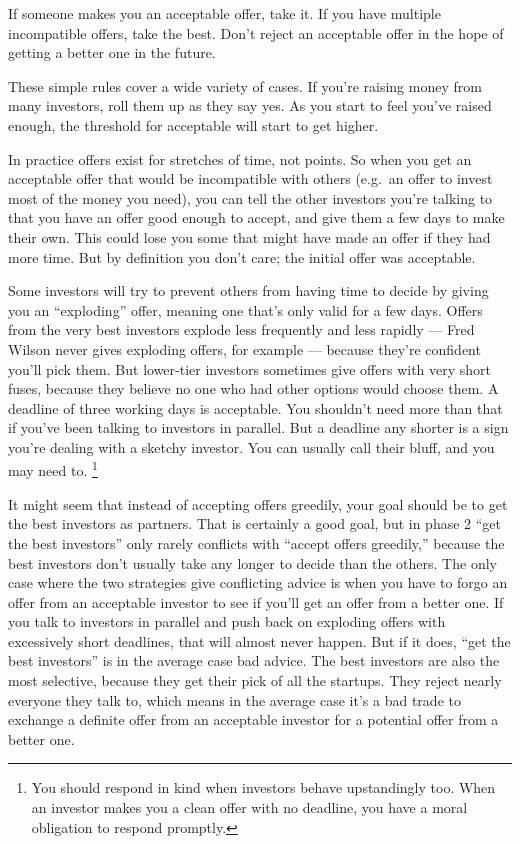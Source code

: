 \documentclass[12pt]{book}
\begin{document}
If someone makes you an acceptable offer, take it. If you have multiple
incompatible offers, take the best. Don't reject an acceptable offer in
the hope of getting a better one in the future.

These simple rules cover a wide variety of cases. If you're raising
money from many investors, roll them up as they say yes. As you start to
feel you've raised enough, the threshold for acceptable will start to
get higher.

In practice offers exist for stretches of time, not points. So when you
get an acceptable offer that would be incompatible with others (e.g.~an
offer to invest most of the money you need), you can tell the other
investors you're talking to that you have an offer good enough to
accept, and give them a few days to make their own. This could lose you
some that might have made an offer if they had more time. But by
definition you don't care; the initial offer was acceptable.

Some investors will try to prevent others from having time to decide by
giving you an ``exploding'' offer, meaning one that's only valid for a
few days. Offers from the very best investors explode less frequently
and less rapidly --- Fred Wilson never gives exploding offers, for
example --- because they're confident you'll pick them. But lower-tier
investors sometimes give offers with very short fuses, because they
believe no one who had other options would choose them. A deadline of
three working days is acceptable. You shouldn't need more than that if
you've been talking to investors in parallel. But a deadline any shorter
is a sign you're dealing with a sketchy investor. You can usually call
their bluff, and you may need to. \footnote{You should respond in kind when investors behave upstandingly
too. When an investor makes you a clean offer with no deadline, you have
a moral obligation to respond promptly.}

It might seem that instead of accepting offers greedily, your goal
should be to get the best investors as partners. That is certainly a
good goal, but in phase 2 ``get the best investors'' only rarely
conflicts with ``accept offers greedily,'' because the best investors
don't usually take any longer to decide than the others. The only case
where the two strategies give conflicting advice is when you have to
forgo an offer from an acceptable investor to see if you'll get an offer
from a better one. If you talk to investors in parallel and push back on
exploding offers with excessively short deadlines, that will almost
never happen. But if it does, ``get the best investors'' is in the
average case bad advice. The best investors are also the most selective,
because they get their pick of all the startups. They reject nearly
everyone they talk to, which means in the average case it's a bad trade
to exchange a definite offer from an acceptable investor for a potential
offer from a better one.
\end{document}
